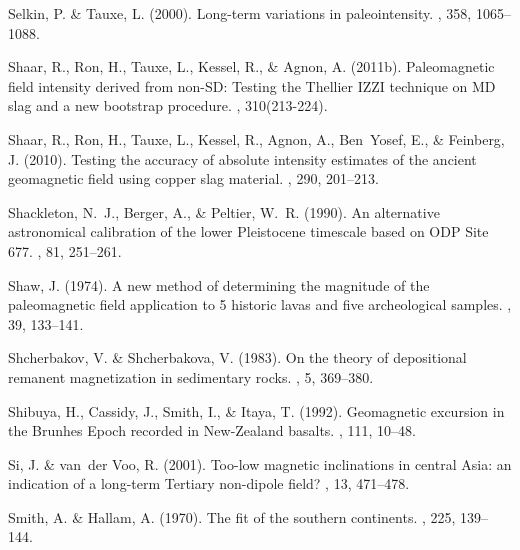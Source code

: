 Selkin, P. \& Tauxe, L. (2000).
\newblock Long-term variations in paleointensity.
, 358, 1065--1088.

Shaar, R., Ron, H., Tauxe, L., Kessel, R., \& Agnon, A. (2011b).
\newblock Paleomagnetic field intensity derived from non-SD: Testing the
  Thellier IZZI technique on MD slag and a new bootstrap procedure.
, 310(213-224).

Shaar, R., Ron, H., Tauxe, L., Kessel, R., Agnon, A., Ben~Yosef, E., \&
  Feinberg, J. (2010).
\newblock Testing the accuracy of absolute intensity estimates of the ancient
  geomagnetic field using copper slag material.
, 290, 201--213.

Shackleton, N.~J., Berger, A., \& Peltier, W.~R. (1990).
\newblock An alternative astronomical calibration of the lower Pleistocene
  timescale based on {ODP} Site 677.
, 81, 251--261.

Shaw, J. (1974).
\newblock A new method of determining the magnitude of the paleomagnetic field
  application to 5 historic lavas and five archeological samples.
, 39, 133--141.

Shcherbakov, V. \& Shcherbakova, V. (1983).
\newblock On the theory of depositional remanent magnetization in sedimentary
  rocks.
, 5, 369--380.

Shibuya, H., Cassidy, J., Smith, I., \& Itaya, T. (1992).
\newblock Geomagnetic excursion in the Brunhes Epoch recorded in New-Zealand
  basalts.
, 111, 10--48.

Si, J. \& van~der Voo, R. (2001).
\newblock Too-low magnetic inclinations in central Asia: an indication of a
  long-term Tertiary non-dipole field?
, 13, 471--478.

Smith, A. \& Hallam, A. (1970).
\newblock The fit of the southern continents.
, 225, 139--144.

